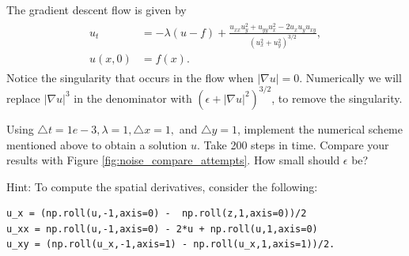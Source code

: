 The gradient descent flow is given by
\begin{align}
	\begin{split}
u_t &= -\lambda (u-f) + \frac{u_{xx}u_y^2 + u_{yy}u_x^2 - 2u_xu_yu_{xy}}{(u_x^2 + u_y^2)^{3/2}} ,\\
u(x,0) &= f(x).
\end{split} \label{tv_images:tv_flow}
\end{align}
Notice the singularity that occurs in the flow when $|\nabla u| = 0$. Numerically we will replace  $|\nabla u|^{3}$ in the denominator with $(\epsilon + |\nabla u|^{2})^{3/2}$, to remove the singularity.


\begin{problem}
Using $\triangle t = 1e-3, \lambda = 1, \triangle x = 1,$ and $ \triangle y = 1$, implement the numerical scheme mentioned above to obtain a solution $u$.  Take 200 steps in time. Compare your results with Figure \ref{fig:noise_compare_attempts}. How small should $\epsilon$ be? 

Hint: To compute the spatial derivatives, consider the following: 
\begin{lstlisting}
u_x = (np.roll(u,-1,axis=0) -  np.roll(z,1,axis=0))/2	
u_xx = np.roll(u,-1,axis=0) - 2*u + np.roll(u,1,axis=0)	
u_xy = (np.roll(u_x,-1,axis=1) - np.roll(u_x,1,axis=1))/2.
\end{lstlisting}
\end{problem}









